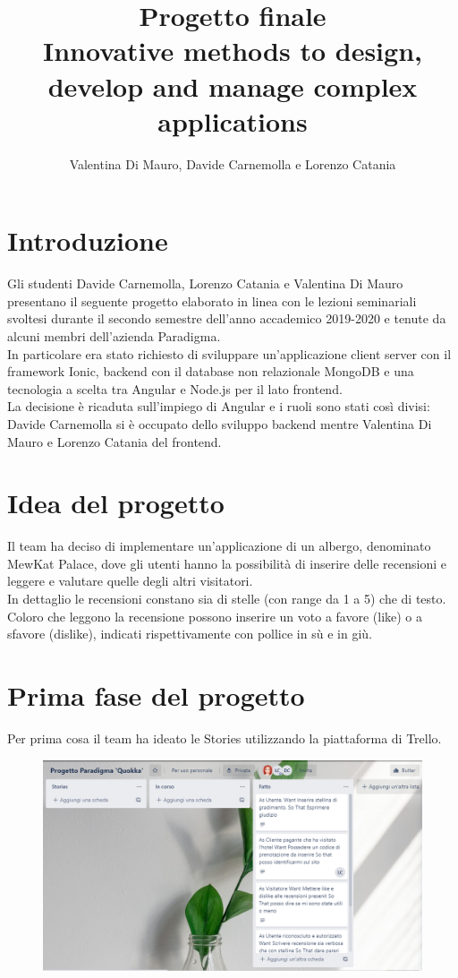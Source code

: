 \documentclass{article}[12pt]
\title{Progetto finale\\Innovative methods to design, develop and manage complex applications}
\author{Valentina Di Mauro, Davide Carnemolla e Lorenzo Catania}
\begin{document}
	\Huge\maketitle\pagebreak
	\section[Introduzione]{Introduzione}\huge{
	Gli studenti Davide Carnemolla, Lorenzo Catania e Valentina Di Mauro presentano il seguente progetto elaborato in linea con le lezioni seminariali svoltesi durante il secondo semestre dell'anno accademico 2019-2020 e tenute da alcuni membri dell'azienda Paradigma.\\ 
	In particolare era stato richiesto di sviluppare un'applicazione client server con il framework Ionic, backend con il database non relazionale MongoDB e una tecnologia a scelta tra Angular e Node.js per il lato frontend. \\La decisione è ricaduta sull'impiego di Angular e i ruoli sono stati così divisi: Davide Carnemolla si è occupato dello sviluppo backend mentre Valentina Di Mauro e Lorenzo Catania del frontend. 
	\section{Idea del progetto}{
	Il team ha deciso di implementare un'applicazione di un albergo, denominato MewKat Palace, dove gli utenti hanno la possibilità di inserire delle recensioni e leggere e valutare quelle degli altri visitatori. \\In dettaglio le recensioni constano sia di stelle (con range da 1 a 5) che di testo.
	Coloro che leggono la recensione possono inserire un voto a favore (like) o a sfavore (dislike), indicati rispettivamente con pollice in sù e in giù.
}
	\section{Prima fase del progetto}{
	Per prima cosa il team ha ideato le Stories utilizzando la piattaforma di Trello.\\ 
		
	\begin{figure}
		\includegraphics[width=\columnwidth]{img/storiapannello.png}
	\end{figure}
\break
	
}}
\end{document}
